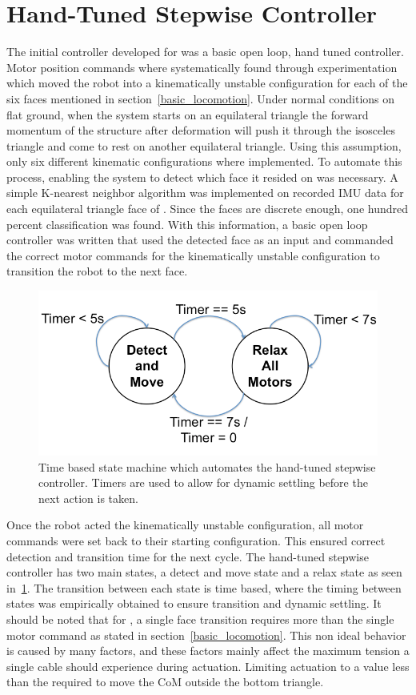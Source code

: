 \section{Hand-Tuned Stepwise Controller}
\label{hand_stepwise}
The initial controller developed for \SB{} was a basic open loop, hand tuned controller.
Motor position commands where systematically found through experimentation which moved the robot into a kinematically unstable configuration for each of the six faces mentioned in section~\ref{basic_locomotion}.
Under normal conditions on flat ground, when the system starts on an equilateral triangle the forward momentum of the structure after deformation will push it through the isosceles triangle and come to rest on another equilateral triangle.
Using this assumption, only six different kinematic configurations where implemented.
To automate this process, enabling the system to detect which face it resided on was necessary.
A simple K-nearest neighbor algorithm was implemented on recorded IMU data for each equilateral triangle face of \SB{}.
Since the faces are discrete enough, one hundred percent classification was found.
With this information, a basic open loop controller was written that used the detected face as an input and commanded the correct motor commands for the kinematically unstable configuration to transition the robot to the next face.

\begin{figure}[thpb]
      \centering
      \includegraphics[width=0.7\columnwidth]{tex/img/Stepwise_state_machine/Slide1_fixed}
      \caption{Time based state machine which automates the hand-tuned stepwise controller. Timers are used to allow for dynamic settling before the next action is taken.}
      \label{fig:stepwise_fsm}
\end{figure}

Once the robot acted the kinematically unstable configuration, all motor commands were set back to their starting configuration.
This ensured correct detection and transition time for the next cycle.
The hand-tuned stepwise controller has two main states, a detect and move state and a relax state as seen in~\ref{fig:stepwise_fsm}.
The transition between each state is time based, where the timing between states was empirically obtained to ensure transition and dynamic settling.
It should be noted that for \SB{}, a single face transition requires more than the single motor command as stated in section~\ref{basic_locomotion}.
This non ideal behavior is caused by many factors, and these factors mainly affect the maximum tension a single cable should experience during actuation.
Limiting actuation to a value less than the required to move the CoM outside the bottom triangle.


